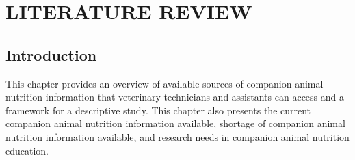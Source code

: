 \chapter{LITERATURE REVIEW}



\section{Introduction}
This chapter provides an overview of available sources of companion animal nutrition information that veterinary technicians and assistants can access and a framework for a descriptive study. This chapter also presents the current companion animal nutrition information available, shortage of companion animal nutrition information available, and research needs in companion animal nutrition education.



